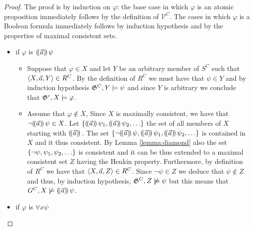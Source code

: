 \documentclass{article}
\theoremstyle{definition}
\begin{document}
\begin{proof}
    The proof is by induction on $\varphi$: the base case in which $\varphi$ is an atomic proposition immediately follows by the definition of $\mathcal{V}^C$. The cases in which $\varphi$ is a Boolean formula immediately follows by induction hypothesis and by the properties of maximal consistent sets.

 \begin{itemize}
     \item if $\varphi$ is $(\!( \vec{a} )\!)\, \psi$
    \begin{itemize}
        \item[] Suppose that  $\varphi \in X$ and let $Y$ be an arbitrary member of $S^C$ such that $\langle X,\vec{a}, Y \rangle\in R^C$. By the definition of $R^C$ we must have that $\psi \in Y$ and by induction hypothesis  $\mathfrak{G}^C, Y \models \psi$ and since $Y$ is arbitrary we conclude that $\mathfrak{G}^c, X \models \varphi$.  
        \item[] Assume that $\varphi \notin X$, Since $X$ is maximally consistent, we have that $\neg (\!( \vec a )\!)\, \psi \in X$. Let $\{(\!( \vec a )\!)\, \psi_1, (\!( \vec a )\!)\,\psi_2,\ldots \}$ the set of all members of $X$ starting with $(\!( \vec a )\!)\,$. The  set $\{\neg (\!( \vec a )\!)\,\psi, (\!( \vec a )\!)\, \psi_1, (\!( \vec a )\!)\,\psi_2,\ldots \}$ is contained in $X$ and it thus consistent. By Lemma \ref{lemma:diamond} also the set $\{\neg \psi, \psi_1, \psi_2, \ldots\}$ is consistent and it can be thus extended to a maximal consistent set $Z$ having the Henkin property.  Furthermore, by definition of $R^C$ we have that $\langle X, \vec a , Z \rangle\in R^C$. Since $\neg \psi\in Z$ we deduce that $\psi \notin Z$ and thus, by induction hypothesis, $\mathfrak{G}^C, Z \not\models \psi$ but this means that $G^C, X \not \models (\!(  \vec a )\!)\,\psi $.

    \end{itemize} 

    \item if $\varphi$ is $\forall x \psi $


\end{itemize}
\end{proof}
\end{document}
